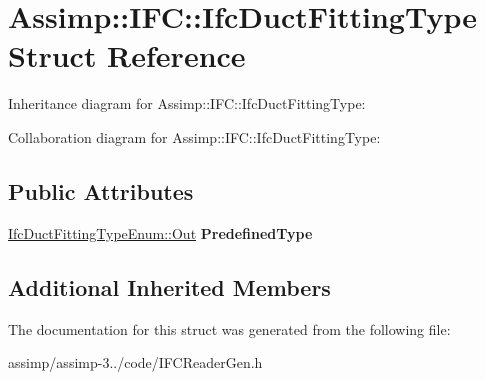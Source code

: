 \hypertarget{struct_assimp_1_1_i_f_c_1_1_ifc_duct_fitting_type}{\section{Assimp\+:\+:I\+F\+C\+:\+:Ifc\+Duct\+Fitting\+Type Struct Reference}
\label{struct_assimp_1_1_i_f_c_1_1_ifc_duct_fitting_type}
}


Inheritance diagram for Assimp\+:\+:I\+F\+C\+:\+:Ifc\+Duct\+Fitting\+Type\+:


Collaboration diagram for Assimp\+:\+:I\+F\+C\+:\+:Ifc\+Duct\+Fitting\+Type\+:
\subsection*{Public Attributes}
\begin{DoxyCompactItemize}
\item 
\hypertarget{struct_assimp_1_1_i_f_c_1_1_ifc_duct_fitting_type_a624c1250694eebff2f10575f6c57909a}{\hyperlink{classboost_1_1shared__ptr}{Ifc\+Duct\+Fitting\+Type\+Enum\+::\+Out} {\bfseries Predefined\+Type}}\label{struct_assimp_1_1_i_f_c_1_1_ifc_duct_fitting_type_a624c1250694eebff2f10575f6c57909a}

\end{DoxyCompactItemize}
\subsection*{Additional Inherited Members}


The documentation for this struct was generated from the following file\+:\begin{DoxyCompactItemize}
\item 
assimp/assimp-\/3../code/I\+F\+C\+Reader\+Gen.\+h\end{DoxyCompactItemize}
